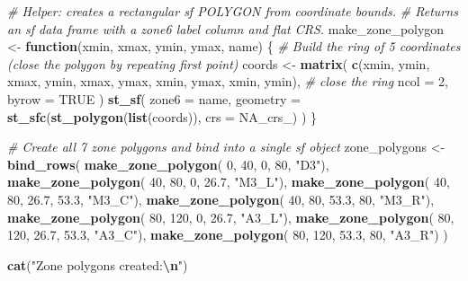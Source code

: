 \documentclass[
]{article}
\newenvironment{Shaded}{\begin{snugshade}}{\end{snugshade}}
\newcommand{\AttributeTok}[1]{\textcolor[rgb]{0.13,0.29,0.53}{#1}}
\newcommand{\CommentTok}[1]{\textcolor[rgb]{0.56,0.35,0.01}{\textit{#1}}}
\newcommand{\ConstantTok}[1]{\textcolor[rgb]{0.56,0.35,0.01}{#1}}
\newcommand{\ControlFlowTok}[1]{\textcolor[rgb]{0.13,0.29,0.53}{\textbf{#1}}}
\newcommand{\DecValTok}[1]{\textcolor[rgb]{0.00,0.00,0.81}{#1}}
\newcommand{\FloatTok}[1]{\textcolor[rgb]{0.00,0.00,0.81}{#1}}
\newcommand{\FunctionTok}[1]{\textcolor[rgb]{0.13,0.29,0.53}{\textbf{#1}}}
\newcommand{\NormalTok}[1]{#1}
\newcommand{\OtherTok}[1]{\textcolor[rgb]{0.56,0.35,0.01}{#1}}
\newcommand{\SpecialCharTok}[1]{\textcolor[rgb]{0.81,0.36,0.00}{\textbf{#1}}}
\newcommand{\StringTok}[1]{\textcolor[rgb]{0.31,0.60,0.02}{#1}}
\begin{document}
\begin{Shaded}
\begin{Highlighting}[]
\CommentTok{\# Helper: creates a rectangular sf POLYGON from coordinate bounds.}
\CommentTok{\# Returns an sf data frame with a zone6 label column and flat CRS.}
\NormalTok{make\_zone\_polygon }\OtherTok{\textless{}{-}} \ControlFlowTok{function}\NormalTok{(xmin, xmax, ymin, ymax, name) \{}
  \CommentTok{\# Build the ring of 5 coordinates (close the polygon by repeating first point)}
\NormalTok{  coords }\OtherTok{\textless{}{-}} \FunctionTok{matrix}\NormalTok{(}
    \FunctionTok{c}\NormalTok{(xmin, ymin,}
\NormalTok{      xmax, ymin,}
\NormalTok{      xmax, ymax,}
\NormalTok{      xmin, ymax,}
\NormalTok{      xmin, ymin),    }\CommentTok{\# close the ring}
    \AttributeTok{ncol =} \DecValTok{2}\NormalTok{, }\AttributeTok{byrow =} \ConstantTok{TRUE}
\NormalTok{  )}
  \FunctionTok{st\_sf}\NormalTok{(}
    \AttributeTok{zone6    =}\NormalTok{ name,}
    \AttributeTok{geometry =} \FunctionTok{st\_sfc}\NormalTok{(}\FunctionTok{st\_polygon}\NormalTok{(}\FunctionTok{list}\NormalTok{(coords)), }\AttributeTok{crs =}\NormalTok{ NA\_crs\_)}
\NormalTok{  )}
\NormalTok{\}}

\CommentTok{\# Create all 7 zone polygons and bind into a single sf object}
\NormalTok{zone\_polygons }\OtherTok{\textless{}{-}} \FunctionTok{bind\_rows}\NormalTok{(}
  \FunctionTok{make\_zone\_polygon}\NormalTok{(  }\DecValTok{0}\NormalTok{,  }\DecValTok{40}\NormalTok{,   }\DecValTok{0}\NormalTok{,  }\DecValTok{80}\NormalTok{,   }\StringTok{"D3"}\NormalTok{),}
  \FunctionTok{make\_zone\_polygon}\NormalTok{( }\DecValTok{40}\NormalTok{,  }\DecValTok{80}\NormalTok{,   }\DecValTok{0}\NormalTok{,  }\FloatTok{26.7}\NormalTok{, }\StringTok{"M3\_L"}\NormalTok{),}
  \FunctionTok{make\_zone\_polygon}\NormalTok{( }\DecValTok{40}\NormalTok{,  }\DecValTok{80}\NormalTok{,  }\FloatTok{26.7}\NormalTok{, }\FloatTok{53.3}\NormalTok{, }\StringTok{"M3\_C"}\NormalTok{),}
  \FunctionTok{make\_zone\_polygon}\NormalTok{( }\DecValTok{40}\NormalTok{,  }\DecValTok{80}\NormalTok{,  }\FloatTok{53.3}\NormalTok{, }\DecValTok{80}\NormalTok{,   }\StringTok{"M3\_R"}\NormalTok{),}
  \FunctionTok{make\_zone\_polygon}\NormalTok{( }\DecValTok{80}\NormalTok{, }\DecValTok{120}\NormalTok{,   }\DecValTok{0}\NormalTok{,  }\FloatTok{26.7}\NormalTok{, }\StringTok{"A3\_L"}\NormalTok{),}
  \FunctionTok{make\_zone\_polygon}\NormalTok{( }\DecValTok{80}\NormalTok{, }\DecValTok{120}\NormalTok{,  }\FloatTok{26.7}\NormalTok{, }\FloatTok{53.3}\NormalTok{, }\StringTok{"A3\_C"}\NormalTok{),}
  \FunctionTok{make\_zone\_polygon}\NormalTok{( }\DecValTok{80}\NormalTok{, }\DecValTok{120}\NormalTok{,  }\FloatTok{53.3}\NormalTok{, }\DecValTok{80}\NormalTok{,   }\StringTok{"A3\_R"}\NormalTok{)}
\NormalTok{)}

\FunctionTok{cat}\NormalTok{(}\StringTok{"Zone polygons created:}\SpecialCharTok{\textbackslash{}n}\StringTok{"}\NormalTok{)}
\end{Highlighting}
\end{Shaded}
\end{document}
